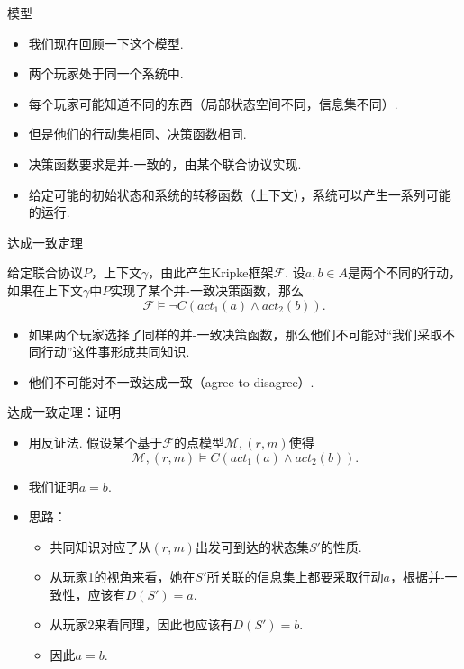 \begin{frame}{模型}
\begin{itemize}
    \item 我们现在回顾一下这个模型.
    \item 两个玩家处于同一个系统中.
    \item 每个玩家可能知道不同的东西（局部状态空间不同，信息集不同）.
    \item 但是他们的行动集相同、决策函数相同.
    \item 决策函数要求是并-一致的，由某个联合协议实现.
    \item 给定可能的初始状态和系统的转移函数（上下文），系统可以产生一系列可能的运行.
\end{itemize}
\end{frame}

\begin{frame}{达成一致定理}
\begin{theorem}
给定联合协议$P$，上下文$\gamma$，由此产生Kripke框架$\mathcal F$. 设$a,b\in A$是两个不同的行动，如果在上下文$\gamma$中$P$实现了某个并-一致决策函数，那么
\[\mathcal F\vDash\neg C(act_1(a)\wedge act_2(b)).\]
\end{theorem}
\begin{itemize}
    \item 如果两个玩家选择了同样的并-一致决策函数，那么他们不可能对“我们采取不同行动”这件事形成共同知识.
    \item 他们不可能对不一致达成一致（agree to disagree）.
\end{itemize}
\end{frame}

\begin{frame}{达成一致定理：证明}
\begin{itemize}
    \item 用反证法. 假设某个基于$\mathcal F$的点模型$\mathcal M,(r,m)$使得
    \[\mathcal M,(r,m)\vDash C(act_1(a)\wedge act_2(b)).\]
    \item 我们证明$a=b$.
    \item 思路：
    \begin{itemize}
        \item 共同知识对应了从$(r,m)$出发可到达的状态集$S'$的性质.
        \item 从玩家1的视角来看，她在$S'$所关联的信息集上都要采取行动$a$，根据并-一致性，应该有$D(S')=a$.
        \item 从玩家2来看同理，因此也应该有$D(S')=b$.
        \item 因此$a=b$.
    \end{itemize}
\end{itemize}
\end{frame}

